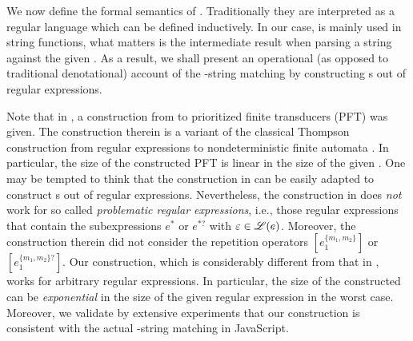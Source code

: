 We now define the formal semantics of {\regexp}. Traditionally they are interpreted as a regular language which can be defined inductively. 
In our case, {\regexp} is mainly used in string functions, %
what matters is %
the intermediate result when parsing a string against the given {\regexp}. %
As a result, we shall present an operational (as opposed to traditional denotational) account of the \regexp-string matching by constructing {\PSST}s out of regular expressions. 


Note that in \cite{BDM14,BM17}, a construction from {\regexp} to prioritized finite transducers (PFT) was given. The construction therein is a variant of the classical Thompson construction from regular expressions to nondeterministic finite automata \cite{Thompson68}. In particular, the size of the constructed PFT is linear in the size of the given {\regexp}. One may be tempted to think that the construction in \cite{BDM14,BM17} can be easily adapted to construct {\PSST}s out of regular expressions. 
%
Nevertheless, the construction in \cite{BDM14,BM17} does \emph{not} work for so called \emph{problematic regular expressions}, i.e.,  those regular expressions that contain the subexpressions $e^*$ or $e^{*?}$ with $\varepsilon \in \mathscr{L}(e)$. Moreover, the construction therein did not consider the repetition operators $[e_1^{\{m_1,m_2\}}]$ or $[e_1^{\{m_1,m_2\}?}]$. 
%
Our construction, which is considerably different from that in \cite{BDM14,BM17}, works for arbitrary regular expressions. In particular, the size of the constructed {\PSST} can be \emph{exponential} in the size of the given regular expression in the worst case. Moreover, we validate by extensive experiments that our construction is consistent with the actual \regexp-string matching in JavaScript. %


